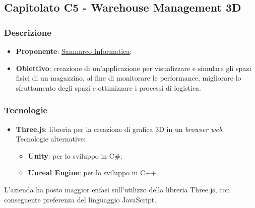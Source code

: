 \subsection{Capitolato C5 - Warehouse Management 3D}

\subsubsection{Descrizione}
\begin{itemize}
    \item \textbf{Proponente}: 
		\href{https://www.sanmarcoinformatica.com/}{Sanmarco Informatica};
    \item \textbf{Obiettivo}:  creazione di un'applicazione per 
		visualizzare e simulare gli spazi fisici di un magazzino, al fine di 
		monitorare le performance, migliorare lo sfruttamento degli spazi e 
		ottimizzare i processi di logistica.
\end{itemize}


\subsubsection{Tecnologie}
\begin{itemize}
    \item \textbf{Three.js}: libreria per la creazione di grafica 3D in un 
		\textit{browser web}. Tecnologie alternative:
        \begin{itemize}
            \item \textbf{Unity}: per lo sviluppo in C\#;
	        \item \textbf{Unreal Engine}: per lo sviluppo in C++.
        \end{itemize}
\end{itemize}
L'azienda ha posto maggior enfasi sull'utilizzo della libreria Three.js, con 
conseguente preferenza del linguaggio JavaScript.


